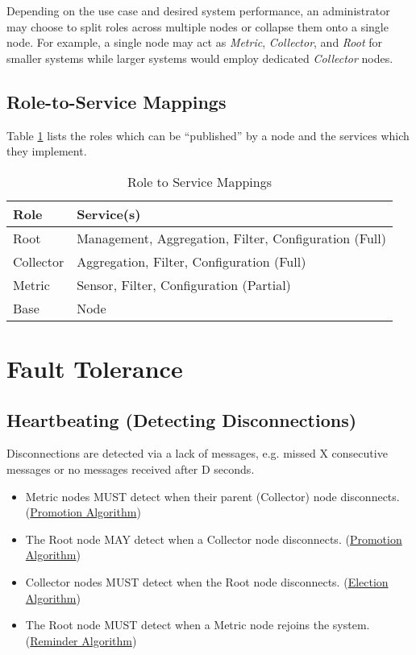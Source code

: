 Depending on the use case and desired system performance, an administrator may choose to split roles across multiple
nodes or collapse them onto a single node. For example, a single node may act as \textit{Metric}, \textit{Collector},
and \textit{Root} for smaller systems while larger systems would employ dedicated \textit{Collector} nodes.

\subsection{Role-to-Service Mappings}

Table \ref{tab:role_to_services} lists the roles which can be ``published'' by a \dcamp node and the services which they
implement.

\begin{table}
\begin{tabular}{l l}

\hline
\textbf{Role} & \textbf{Service(s)} \\
\hline

Root & Management, Aggregation, Filter, Configuration (Full) \\

Collector & Aggregation, Filter, Configuration (Full) \\

Metric & Sensor, Filter, Configuration (Partial) \\

Base & Node \\

\end{tabular}
\caption{Role to Service Mappings}
\label{tab:role_to_services}
\end{table}

\section{Fault Tolerance}

\subsection{Heartbeating (Detecting Disconnections)}

Disconnections are detected via a lack of messages, e.g. missed X consecutive messages or no messages received after D
seconds.

\begin{itemize}
\item Metric nodes MUST detect when their parent (Collector) node disconnects. (\hyperref[algor_promo]{Promotion Algorithm})
\item The Root node MAY detect when a Collector node disconnects. (\hyperref[algor_promo]{Promotion Algorithm})
\item Collector nodes MUST detect when the Root node disconnects. (\hyperref[algor_elect]{Election Algorithm})
\item The Root node MUST detect when a Metric node rejoins the system. (\hyperref[algor_remind]{Reminder Algorithm})
\end{itemize}


